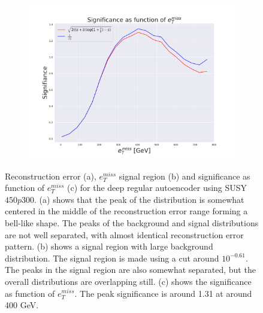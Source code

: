 \begin{figure}[H]
    \hfill  
    \begin{subfigure}{.40\textwidth}
        \includegraphics[width=\textwidth]{Figures/VAE_testing/small/2lep/significance_etmiss_450p0p0300_-0.6363602624727392.pdf}
        \caption{}
        \label{fig:VAE_2lep_small_signi_450_2}
    \end{subfigure}
    \hfill      
    \caption[2lep shallow network | $450p300$ | VAE | 2]{Reconstruction error (a), $e_T^{miss}$ signal region (b) and significance as function of 
    $e_T^{miss}$ (c) for the deep regular autoencoder using SUSY $450p300$. 
    (a) shows that the peak of the distribution is somewhat centered in the middle 
    of the reconstruction error range forming a bell-like shape. The peaks of the background and signal 
    distributions are not well separated, with almost identical reconstruction error pattern. (b) 
    shows a signal region with large background distribution. The signal region is made using a cut around
    $10^{-0.61}$. The peaks in the signal region are also somewhat 
    separated, but the overall distributions are overlapping still. 
    (c) shows the significance as function of $e_T^{miss}$. 
    The peak significance is around 1.31 at around 400 GeV.}
    \label{fig:VAE_2lep_small_rec_sig_signi_450_2}
\end{figure}


